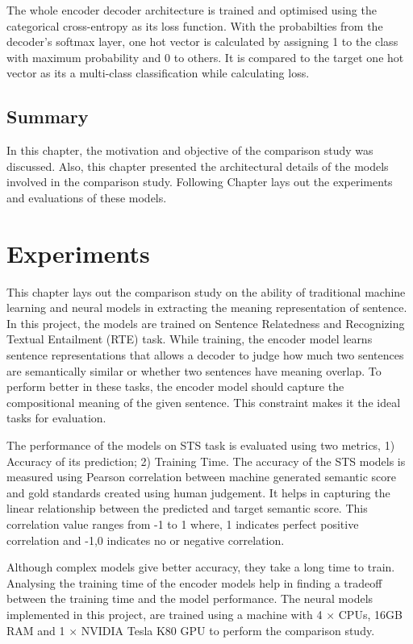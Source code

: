 \documentclass[12pt]{report} %
\begin{document}
	The whole encoder decoder architecture is trained  and optimised using the categorical cross-entropy as its loss function. With the probabilties from the decoder's softmax layer, one hot vector is calculated by assigning 1 to the class with maximum probability and 0 to others. It is compared to the target one hot vector as its a multi-class classification while calculating loss.
	
	\section{Summary}
	In this chapter, the motivation and objective of the comparison study was discussed. Also, this chapter presented the architectural details of the models involved in the comparison study. Following Chapter lays out the experiments and evaluations of these models.
	
	  
	 
\chapter{Experiments}

 This chapter lays out the comparison study on the ability of traditional machine learning and neural models in extracting the meaning representation of sentence. In this project, the models are trained on Sentence Relatedness and Recognizing Textual Entailment (RTE) task. While training, the encoder model learns sentence representations that allows a decoder to judge how much two sentences are semantically similar or whether two sentences have meaning overlap. To perform better in these tasks, the encoder model should capture the compositional meaning of the given sentence. This constraint makes it the ideal tasks for evaluation. 
 
 
 The performance of the models on STS task is evaluated using two metrics, 1) Accuracy of its prediction; 2) Training Time. The accuracy of the STS models is measured using Pearson correlation between machine generated semantic score and gold standards created using human judgement. It helps in capturing the linear relationship between the predicted and target semantic score. This correlation value ranges from -1 to 1 where, 1 indicates perfect positive correlation and -1,0 indicates no or negative correlation.
 
 Although complex models give better accuracy, they take a long time to train. Analysing the training time of the encoder models help in finding a tradeoff between the training time and the model performance. The neural models implemented in this project, are trained using a machine with 4 $\times$ CPUs, 16GB RAM and 1 $\times$ NVIDIA Tesla K80 GPU to perform the comparison study.
 
\end{document}
